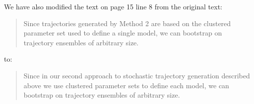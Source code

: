 \documentclass{article}
\begin{document}
\begin{enumerate}[label={Comment \theenumi :}, leftmargin=3.9\parindent]
    We have also modified the text on page 15 line 8 from the original text:
    \begin{quote}
    Since trajectories generated by Method 2 are based on the clustered parameter set used to define a
    single model, we can bootstrap on trajectory ensembles of arbitrary size.
    \end{quote}
    
    to:
    \begin{quote}
    Since in our second approach to stochastic trajectory generation described above we use clustered 
    parameter sets to define each model, we can bootstrap on trajectory ensembles of arbitrary size.
    \end{quote}

\end{enumerate}



\end{document}
